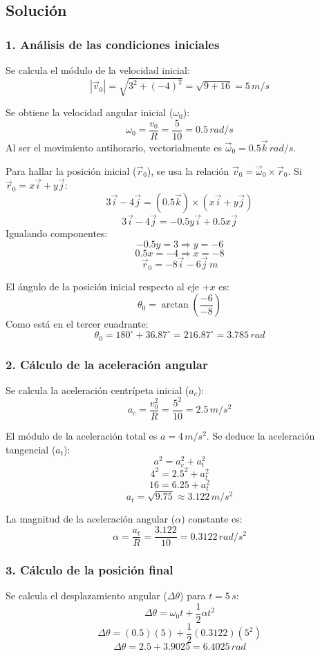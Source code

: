 \documentclass[12pt, a4paper]{article}
\begin{document}
\subsection*{Solución}

\subsubsection*{1. Análisis de las condiciones iniciales}
Se calcula el módulo de la velocidad inicial:
$$ |\vec{v}_0| = \sqrt{3^2 + (-4)^2} = \sqrt{9 + 16} = 5 \, \si{m/s} $$

Se obtiene la velocidad angular inicial ($\omega_0$):
$$ \omega_0 = \frac{v_0}{R} = \frac{5}{10} = 0.5 \, \si{rad/s} $$
Al ser el movimiento antihorario, vectorialmente es $\vec{\omega}_0 = 0.5\vec{k} \, \si{rad/s}$.

Para hallar la posición inicial ($\vec{r}_0$), se usa la relación $\vec{v}_0 = \vec{\omega}_0 \times \vec{r}_0$. Si $\vec{r}_0 = x\vec{i} + y\vec{j}$:
$$ 3\vec{i} - 4\vec{j} = (0.5\vec{k}) \times (x\vec{i} + y\vec{j}) $$
$$ 3\vec{i} - 4\vec{j} = -0.5y\vec{i} + 0.5x\vec{j} $$
Igualando componentes:
$$ -0.5y = 3 \Rightarrow y = -6 $$
$$ 0.5x = -4 \Rightarrow x = -8 $$
$$ \vec{r}_0 = -8\vec{i} - 6\vec{j} \, \si{m} $$

El ángulo de la posición inicial respecto al eje $+x$ es:
$$ \theta_0 = \arctan\left(\frac{-6}{-8}\right) $$
Como está en el tercer cuadrante:
$$ \theta_0 = 180^\circ + 36.87^\circ = 216.87^\circ = 3.785 \, \si{rad} $$

\subsubsection*{2. Cálculo de la aceleración angular}
Se calcula la aceleración centrípeta inicial ($a_c$):
$$ a_c = \frac{v_0^2}{R} = \frac{5^2}{10} = 2.5 \, \si{m/s^2} $$

El módulo de la aceleración total es $a = 4 \, \si{m/s^2}$. Se deduce la aceleración tangencial ($a_t$):
$$ a^2 = a_c^2 + a_t^2 $$
$$ 4^2 = 2.5^2 + a_t^2 $$
$$ 16 = 6.25 + a_t^2 $$
$$ a_t = \sqrt{9.75} \approx 3.122 \, \si{m/s^2} $$

La magnitud de la aceleración angular ($\alpha$) constante es:
$$ \alpha = \frac{a_t}{R} = \frac{3.122}{10} = 0.3122 \, \si{rad/s^2} $$

\subsubsection*{3. Cálculo de la posición final}
Se calcula el desplazamiento angular ($\Delta\theta$) para $t = 5 \, \si{s}$:
$$ \Delta\theta = \omega_0 t + \frac{1}{2}\alpha t^2 $$
$$ \Delta\theta = (0.5)(5) + \frac{1}{2}(0.3122)(5^2) $$
$$ \Delta\theta = 2.5 + 3.9025 = 6.4025 \, \si{rad} $$
\end{document}
